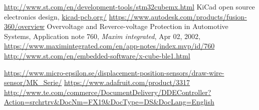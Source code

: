 \begin{thebibliography}{9}
\label{sec:ref}


  \url{http://www.st.com/en/development-tools/stm32cubemx.html}
  KiCad open source electronics design,
  \url{kicad-pcb.org/}
  \url{https://www.autodesk.com/products/fusion-360/overview}
	Overvoltage and Reverce-voltage Protection in Automotive Systems,
	Application note 760, \emph{Maxim integrated}, Apr 02, 2002, 
	\url{https://www.maximintegrated.com/en/app-notes/index.mvp/id/760}
  \url{http://www.st.com/en/embedded-software/x-cube-ble1.html}

 \url{https://www.micro-epsilon.se/displacement-position-sensors/draw-wire-sensor/MK_Serie/}
 \url{https://www.adafruit.com/product/3317}
 \url{http://www.te.com/commerce/DocumentDelivery/DDEController?Action=srchrtrv&DocNm=FX19&DocType=DS&DocLang=English}


\end{thebibliography}
